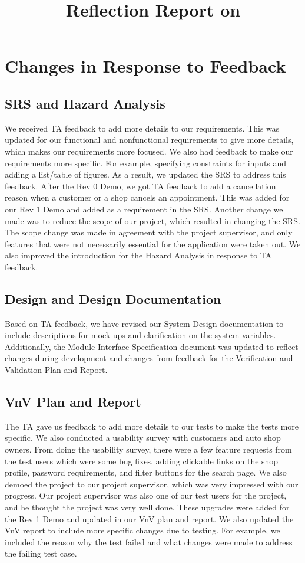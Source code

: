 \documentclass{article}
\title{Reflection Report on \progname}
\author{\authname}
\date{}
\begin{document}
\maketitle

\section{Changes in Response to Feedback}

\subsection{SRS and Hazard Analysis}
We received TA feedback to add more details to our requirements. This was updated for our
functional and nonfunctional requirements to give more details, which makes our requirements more
focused. We also had feedback to make our requirements more specific. For example, specifying
constraints for inputs and adding a list/table of figures. As a result, we updated the SRS to
address this feedback. After the Rev 0 Demo, we got TA feedback to add a cancellation reason when a
customer or a shop cancels an appointment. This was added for our Rev 1 Demo and added as a
requirement in the SRS. Another change we made was to reduce the scope of our project, which
resulted in changing the SRS. The scope change was made in agreement with the project supervisor,
and only features that were not necessarily essential for the application were taken out. We also
improved the introduction for the Hazard Analysis in response to TA feedback.

\subsection{Design and Design Documentation}
Based on TA feedback, we have revised our System Design documentation to include descriptions for
mock-ups and clarification on the system variables. Additionally, the Module Interface
Specification document was updated to reflect changes during development and changes from feedback
for the Verification and Validation Plan and Report.

\subsection{VnV Plan and Report}
The TA gave us feedback to add more details to our tests to make the tests more specific. We also
conducted a usability survey with customers and auto shop owners. From doing the usability survey,
there were a few feature requests from the test users which were some bug fixes, adding clickable
links on the shop profile, password requirements, and filter buttons for the search page. We also
demoed the project to our project supervisor, which was very impressed with our progress. Our
project supervisor was also one of our test users for the project, and he thought the project was
very well done. These upgrades were added for the Rev 1 Demo and updated in our VnV plan and
report. We also updated the VnV report to include more specific changes due to testing. For
example, we included the reason why the test failed and what changes were made to address the
failing test case.
\end{document}
